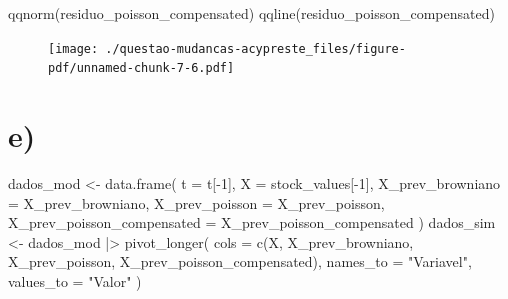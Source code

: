 \documentclass[
  letterpaper,
  DIV=11,
  numbers=noendperiod]{scrreprt}
\newenvironment{Shaded}{\begin{snugshade}}{\end{snugshade}}
\newcommand{\AttributeTok}[1]{\textcolor[rgb]{0.40,0.45,0.13}{#1}}
\newcommand{\DecValTok}[1]{\textcolor[rgb]{0.68,0.00,0.00}{#1}}
\newcommand{\FunctionTok}[1]{\textcolor[rgb]{0.28,0.35,0.67}{#1}}
\newcommand{\NormalTok}[1]{\textcolor[rgb]{0.00,0.23,0.31}{#1}}
\newcommand{\OtherTok}[1]{\textcolor[rgb]{0.00,0.23,0.31}{#1}}
\newcommand{\SpecialCharTok}[1]{\textcolor[rgb]{0.37,0.37,0.37}{#1}}
\newcommand{\StringTok}[1]{\textcolor[rgb]{0.13,0.47,0.30}{#1}}
\begin{document}
\begin{Shaded}
\begin{Highlighting}[]
\FunctionTok{qqnorm}\NormalTok{(residuo\_poisson\_compensated)}
\FunctionTok{qqline}\NormalTok{(residuo\_poisson\_compensated)}
\end{Highlighting}
\end{Shaded}

\begin{figure}[H]

{\centering \texttt{[image: ./questao-mudancas-acypreste\_files/figure-pdf/unnamed-chunk-7-6.pdf]}

}

\end{figure}

\hypertarget{e}{%
\section*{e)}\label{e}}


\begin{Shaded}
\begin{Highlighting}[]
\NormalTok{dados\_mod }\OtherTok{\textless{}{-}} \FunctionTok{data.frame}\NormalTok{(}
    \AttributeTok{t =}\NormalTok{ t[}\SpecialCharTok{{-}}\DecValTok{1}\NormalTok{],}
    \AttributeTok{X =}\NormalTok{ stock\_values[}\SpecialCharTok{{-}}\DecValTok{1}\NormalTok{],}
    \AttributeTok{X\_prev\_browniano =}\NormalTok{ X\_prev\_browniano,}
    \AttributeTok{X\_prev\_poisson =}\NormalTok{ X\_prev\_poisson,}
    \AttributeTok{X\_prev\_poisson\_compensated =}\NormalTok{ X\_prev\_poisson\_compensated}
\NormalTok{)}
\NormalTok{dados\_sim }\OtherTok{\textless{}{-}}\NormalTok{ dados\_mod }\SpecialCharTok{|\textgreater{}}
    \FunctionTok{pivot\_longer}\NormalTok{(}
        \AttributeTok{cols =} \FunctionTok{c}\NormalTok{(X, X\_prev\_browniano, X\_prev\_poisson, X\_prev\_poisson\_compensated),}
        \AttributeTok{names\_to =} \StringTok{"Variavel"}\NormalTok{,}
        \AttributeTok{values\_to =} \StringTok{"Valor"}
\NormalTok{    )}
\end{Highlighting}
\end{Shaded}
\end{document}
